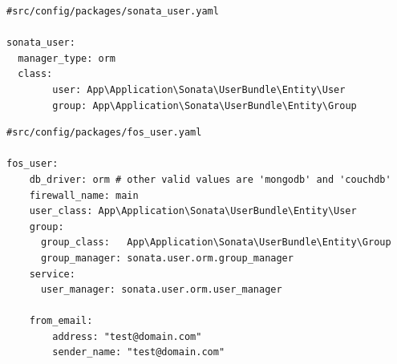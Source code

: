 \begin{lstlisting}[caption={Archivo de configuración de Sonata-User.}]
#src/config/packages/sonata_user.yaml

sonata_user:
  manager_type: orm
  class:
        user: App\Application\Sonata\UserBundle\Entity\User
        group: App\Application\Sonata\UserBundle\Entity\Group

\end{lstlisting}

\newpage
\begin{lstlisting}[caption=Archivo de configuración de FOSUser.]
#src/config/packages/fos_user.yaml

fos_user:
    db_driver: orm # other valid values are 'mongodb' and 'couchdb'
    firewall_name: main
    user_class: App\Application\Sonata\UserBundle\Entity\User
    group:
      group_class:   App\Application\Sonata\UserBundle\Entity\Group
      group_manager: sonata.user.orm.group_manager
    service:
      user_manager: sonata.user.orm.user_manager

    from_email:
        address: "test@domain.com"
        sender_name: "test@domain.com"

\end{lstlisting}



